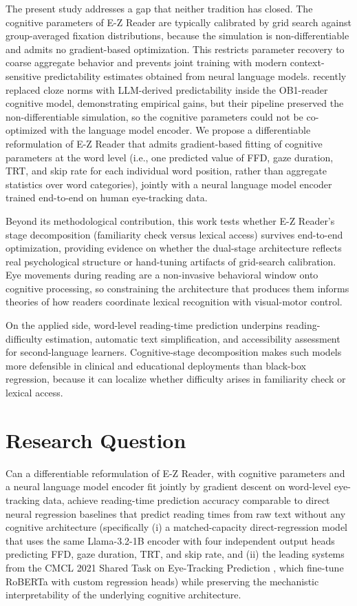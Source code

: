 \documentclass[12pt]{article}
\begin{document}
The present study addresses a gap that neither tradition has closed. The
cognitive parameters of E-Z Reader are typically calibrated by grid search
against group-averaged fixation distributions, because the simulation is
non-differentiable and admits no gradient-based optimization. This restricts
parameter recovery to coarse aggregate behavior and prevents joint training
with modern context-sensitive predictability estimates obtained from neural
language models. \citet{lopesrego2024language} recently replaced cloze norms
with LLM-derived predictability inside the OB1-reader cognitive model,
demonstrating empirical gains, but their pipeline preserved the
non-differentiable simulation, so the cognitive parameters could not be
co-optimized with the language model encoder. We propose a differentiable
reformulation of E-Z Reader that admits gradient-based fitting of cognitive
parameters at the word level (i.e., one predicted value of FFD, gaze
duration, TRT, and skip rate for each individual word position, rather than
aggregate statistics over word categories), jointly with a neural language
model encoder
trained end-to-end on human eye-tracking data.

Beyond its methodological contribution, this work tests whether E-Z
Reader's stage decomposition (familiarity check versus lexical access)
survives end-to-end optimization, providing evidence on whether the
dual-stage architecture reflects real psychological structure or hand-tuning
artifacts of grid-search calibration. Eye movements during reading are a
non-invasive behavioral window onto cognitive processing, so constraining
the architecture that produces them informs theories of how readers
coordinate lexical recognition with visual-motor control.

On the applied side, word-level reading-time prediction underpins
reading-difficulty estimation, automatic text simplification, and
accessibility assessment for second-language learners. Cognitive-stage
decomposition makes such models more defensible in clinical and educational
deployments than black-box regression, because it can localize whether
difficulty arises in familiarity check or lexical access.

\section{Research Question}

Can a differentiable reformulation of E-Z Reader, with cognitive parameters
and a neural language model encoder fit jointly by gradient descent on
word-level eye-tracking data, achieve reading-time prediction accuracy
comparable to direct neural regression baselines that predict reading times
from raw text without any cognitive architecture (specifically (i) a
matched-capacity direct-regression model that uses the same Llama-3.2-1B
encoder with four independent output heads predicting FFD, gaze duration,
TRT, and skip rate, and (ii) the leading systems from the CMCL 2021 Shared
Task on Eye-Tracking Prediction \citep{hollenstein2021cmcl}, which fine-tune
RoBERTa with custom regression heads) while preserving the mechanistic
interpretability of the underlying cognitive architecture.
\end{document}
